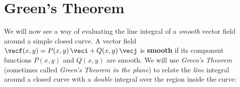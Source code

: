 \section{Green's Theorem}\label{sec:greens}

We will now see a way of evaluating the line integral of a \emph{smooth} vector field around a simple closed curve. A vector field $\vecf(x,y) = P(x,y)\,\veci + Q(x,y)\,\vecj$ is \textbf{smooth} if its component functions $P(x,y)$ and $Q(x,y)$ are smooth. We will use \emph{Green's Theorem} (sometimes called \emph{Green's Theorem in the plane}) to relate the \emph{line} integral around a closed curve with a \emph{double} integral over the region inside the curve:



